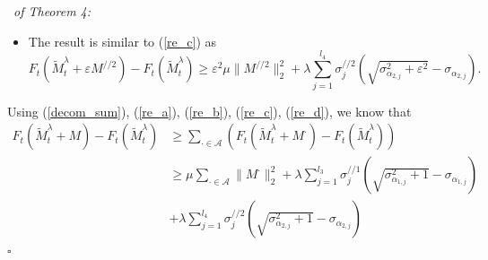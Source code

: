 \documentclass[12pt]{article}
\newenvironment{pf}{{\noindent\it Proof}\ }{\hfill $\square$\par}
\begin{document}
\begin{pf}{\it of Theorem 4:}
\begin{itemize}
\begin{equation*}
\begin{aligned}
  2\xi\mu\|M^{//1}\|_2^2 + \lambda \sum_{j=1}^{l_3}\frac{\sigma_{j}^{//1}\xi }{\sqrt{\sigma_{\alpha_{1,j}}^2+ \xi^2}}.
  \end{aligned}
  \end{equation*}
  Then
  \begin{equation*}
  F_t(\widetilde{M}_t^\lambda +\varepsilon M^{//1})- F_t(\widetilde{M}_t^\lambda +\xi M^{//2})\ge 2(\varepsilon-\xi)\xi \mu\|M^{//1}\|_2^2 +(\varepsilon-\xi)\lambda \sum_{j=1}^{l_3}\frac{\sigma_{j}^{//1}\xi }{\sqrt{\sigma_{\alpha_{1,j}}^2+ \xi^2}},
  \end{equation*}
  which means that
  \begin{equation}
  \label{re_c}
  \begin{aligned}
  F_t(\widetilde{M}_t^\lambda +\varepsilon M^{//1})- F_t(\widetilde{M}_t^\lambda)&\ge \mu\|M^{//1}\|_2^2 \int_{0}^\varepsilon 2\xi d\xi  + \lambda \sum_{j=1}^{l_3}\int_{0}^\varepsilon \frac{\sigma_{j}^{//1}\xi }{\sqrt{\sigma_{\alpha_{1,j}}^2 +\xi^2}}d\xi
  \\&= \varepsilon^2 \mu\|M^{//1}\|_2^2 + \lambda\sum_{j=1}^{l_3}\sigma_{j}^{//1} \left(\sqrt{\sigma_{\alpha_{1,j}}^2+\varepsilon^2}-\sigma_{\alpha_{1,j}}\right).
  \end{aligned}
  \end{equation}
  \item[d.] The result is similar to (\ref{re_c}) as
  \begin{equation}
  \label{re_d}
  F_t(\widetilde{M}_t^\lambda +\varepsilon M^{//2})- F_t(\widetilde{M}_t^\lambda)\ge  \varepsilon^2 \mu\|M^{//2}\|_2^2 + \lambda\sum_{j=1}^{l_4}\sigma_{j}^{//2} \left(\sqrt{\sigma_{\alpha_{2,j}}^2+\varepsilon^2}-\sigma_{\alpha_{2,j}}\right).
  \end{equation}
  \end{itemize}
  Using (\ref{decom_sum}), (\ref{re_a}), (\ref{re_b}), (\ref{re_c}), (\ref{re_d}), we know that
  \begin{equation}
  \label{value_ineq}
  \begin{aligned}
  F_t(\widetilde{M}_t^\lambda +  M ) - F_t(\widetilde{M}_t^\lambda ) &\ge  \sum_{\cdot \in \mathcal{A}}\left( F_t(\widetilde{M}_t^\lambda + M^{\cdot} )- F_t(\widetilde{M}_t^\lambda )\right)\\& \ge 
  \mu \sum_{\cdot \in \mathcal{A}}\|M^\cdot\|_2^2 + \lambda\sum_{j=1}^{l_3}\sigma_{j}^{//1} \left(\sqrt{\sigma_{\alpha_{1,j}}^2+1}-\sigma_{\alpha_{1,j}}\right)\\&+\lambda\sum_{j=1}^{l_4}\sigma_{j}^{//2} \left(\sqrt{\sigma_{\alpha_{2,j}}^2+1}-\sigma_{\alpha_{2,j}}\right)

\end{aligned}
\end{equation}
\end{pf}
\end{document}

